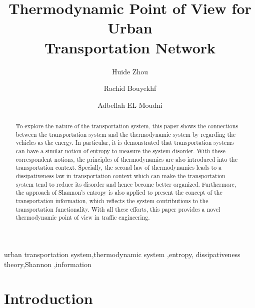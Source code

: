 \documentclass[preprint,authoryear,12pt]{elsarticle}
\begin{document}
\begin{frontmatter}

\title{Thermodynamic Point of View for Urban\\ Transportation
Network}
\author[SeT]{Huide Zhou}
\author[SeT]{Rachid Bouyekhf}
\author[SeT]{Adbellah EL Moudni}
\address[SeT]{Laboratoire Syst\`{e}mes et Transports (SeT),\\
Universit\'{e} de Technologie de Belfort-Montb\'{e}liard (UTBM)\\
Rue Thierry Mieg, 90010 Belfort Cedex, France}

\begin{abstract}
To explore the nature of the transportation system, this paper shows
the connections between the transportation system and the
thermodynamic system by regarding the vehicles as the energy. In
particular, it is demonstrated that transportation systems can have a
similar notion of entropy to measure the system disorder. With these
correspondent notions, the principles of thermodynamics are also
introduced into the transportation context. Specially, the second law
of thermodynamics leads to a dissipativeness law in transportation
context which can make the transportation system tend to reduce its
disorder and hence become better organized. Furthermore, the approach
of Shannon's entropy is also applied to present the concept of the
transportation information, which reflects the system contributions
to the transportation functionality. With all these efforts, this
paper provides a novel thermodynamic point of view in traffic
engineering.
\end{abstract}

\begin{keyword}
urban transportation system\sep thermodynamic system \sep entropy\sep
dissipativeness theory\sep Shannon \sep information
\end{keyword}

\end{frontmatter}


\section{Introduction}
\end{document}
